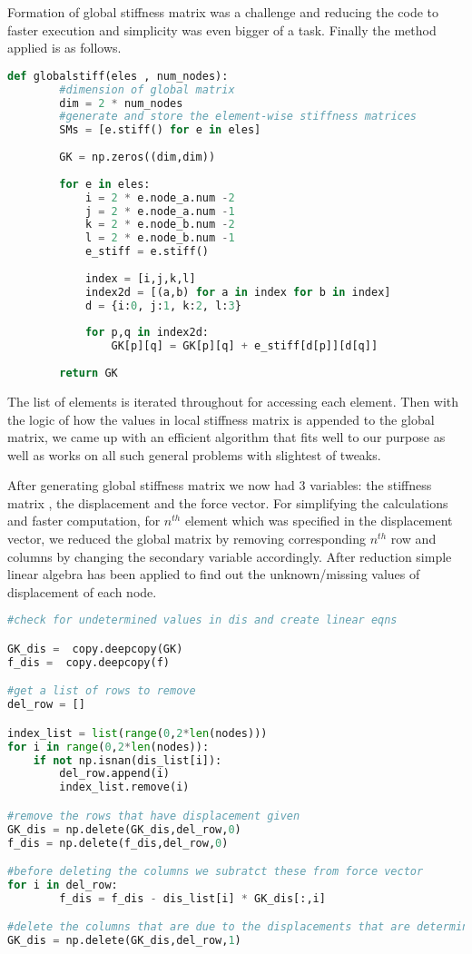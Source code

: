 Formation of global stiffness matrix was a challenge and reducing the code to faster execution and simplicity was even bigger of a task. Finally the method applied is as follows.


\begin{lstlisting}[language=Python , basicstyle=\linespread{0.75}\listingsfont]
	def globalstiff(eles , num_nodes):
		#dimension of global matrix
		dim = 2 * num_nodes
		#generate and store the element-wise stiffness matrices
		SMs = [e.stiff() for e in eles]
	
		GK = np.zeros((dim,dim))
		
		for e in eles:
			i = 2 * e.node_a.num -2
			j = 2 * e.node_a.num -1
			k = 2 * e.node_b.num -2
			l = 2 * e.node_b.num -1
			e_stiff = e.stiff()
	
			index = [i,j,k,l]
			index2d = [(a,b) for a in index for b in index]
			d = {i:0, j:1, k:2, l:3}
			
			for p,q in index2d:
			    GK[p][q] = GK[p][q] + e_stiff[d[p]][d[q]]
		
		return GK
\end{lstlisting}

The list of elements is iterated throughout for accessing each element. Then with the logic of how the values in local stiffness matrix is appended to the global matrix, we came up with an efficient algorithm that fits well to our purpose as well as works on all such general problems with slightest of tweaks.

After generating global stiffness matrix we now had 3 variables: the stiffness matrix , the displacement and the force vector. For simplifying the calculations and faster computation, for $n^{th}$ element which was specified in the displacement vector, we reduced the global matrix by removing corresponding $n^{th}$ row and columns by changing the secondary variable accordingly.  After reduction simple linear algebra has been applied to find out the unknown/missing values of displacement of each node. 

\begin{lstlisting}[language=Python , basicstyle=\linespread{0.75}\listingsfont]
#check for undetermined values in dis and create linear eqns

GK_dis =  copy.deepcopy(GK)
f_dis =  copy.deepcopy(f)

#get a list of rows to remove
del_row = []

index_list = list(range(0,2*len(nodes)))
for i in range(0,2*len(nodes)):
    if not np.isnan(dis_list[i]):
        del_row.append(i)
        index_list.remove(i)

#remove the rows that have displacement given
GK_dis = np.delete(GK_dis,del_row,0)
f_dis = np.delete(f_dis,del_row,0)

#before deleting the columns we subratct these from force vector
for i in del_row:
        f_dis = f_dis - dis_list[i] * GK_dis[:,i]

#delete the columns that are due to the displacements that are determined
GK_dis = np.delete(GK_dis,del_row,1)
\end{lstlisting}


